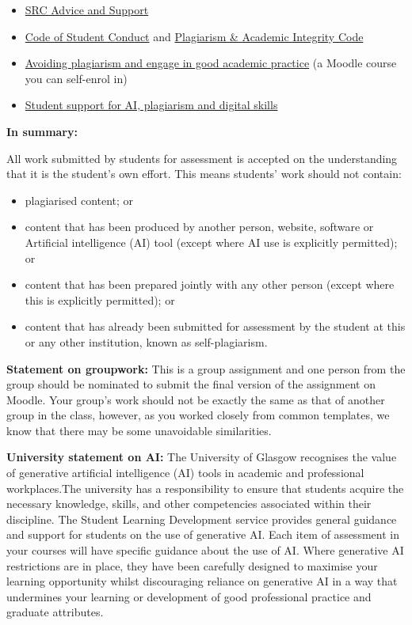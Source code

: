 \documentclass[
  english,
  letterpaper,
  DIV=11,
  numbers=noendperiod]{scrreprt}
\providecommand{\tightlist}{%
  \setlength{\itemsep}{0pt}\setlength{\parskip}{0pt}}
\begin{document}
\begin{itemize}
\tightlist
\item
  \href{https://www.glasgowunisrc.org/advice/}{SRC Advice and Support}
\item
  \href{https://www.gla.ac.uk/myglasgow/apg/policies/uniregs/regulations2025-26/feesandgeneral/studentsupportandconductmatters/reg33/}{Code
  of Student Conduct} and
  \href{https://www.gla.ac.uk/myglasgow/apg/policies/uniregs/regulations2025-26/feesandgeneral/studentsupportandconductmatters/reg32/}{Plagiarism
  \& Academic Integrity Code}
\item
  \href{https://moodle.gla.ac.uk/course/view.php?id=13038}{Avoiding
  plagiarism and engage in good academic practice} (a Moodle course you
  can self-enrol in)
\item
  \href{https://www.gla.ac.uk/myglasgow/sld/}{Student support for AI,
  plagiarism and digital skills}
\end{itemize}

\textbf{In summary:}

All work submitted by students for assessment is accepted on the
understanding that it is the student's own effort. This means students'
work should not contain:

\begin{itemize}
\tightlist
\item
  plagiarised content; or
\item
  content that has been produced by another person, website, software or
  Artificial intelligence (AI) tool (except where AI use is explicitly
  permitted); or
\item
  content that has been prepared jointly with any other person (except
  where this is explicitly permitted); or
\item
  content that has already been submitted for assessment by the student
  at this or any other institution, known as self-plagiarism.
\end{itemize}

\textbf{Statement on groupwork:} This is a group assignment and one
person from the group should be nominated to submit the final version of
the assignment on Moodle. Your group's work should not be exactly the
same as that of another group in the class, however, as you worked
closely from common templates, we know that there may be some
unavoidable similarities.

\textbf{University statement on AI:} The University of Glasgow
recognises the value of generative artificial intelligence (AI) tools in
academic and professional workplaces.The university has a responsibility
to ensure that students acquire the necessary knowledge, skills, and
other competencies associated within their discipline. The Student
Learning Development service provides general guidance and support for
students on the use of generative AI. Each item of assessment in your
courses will have specific guidance about the use of AI. Where
generative AI restrictions are in place, they have been carefully
designed to maximise your learning opportunity whilst discouraging
reliance on generative AI in a way that undermines your learning or
development of good professional practice and graduate attributes.
\end{document}
